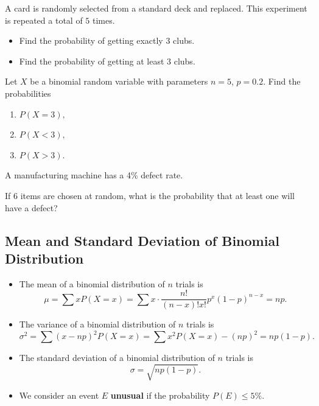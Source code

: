 \begin{example}

A card is randomly selected from a standard deck and replaced. This
experiment is repeated a total of \(5\) times.

\begin{itemize}
\item
  Find the probability of getting exactly \(3\) clubs.
\item
  Find the probability of getting at least \(3\) clubs.
\end{itemize}

\end{example}

\begin{exercise}

Let \(X\) be a binomial random variable with parameters \(n = 5\),
\(p=0.2\). Find the probabilities

\begin{enumerate}
\item
  \(P(X=3),\)
\item
  \(P(X<3),\)
\item
  \(P(X>3).\)
\end{enumerate}

\end{exercise}

\begin{exercise}

A manufacturing machine has a 4\% defect rate.

If 6 items are chosen at random, what is the probability that at least
one will have a defect?

\end{exercise}

\hypertarget{mean-and-standard-deviation-of-binomial-distribution}{%
\subsection{Mean and Standard Deviation of Binomial
Distribution}\label{mean-and-standard-deviation-of-binomial-distribution}}

\begin{itemize}
\item
  The mean of a binomial distribution of \(n\) trials is
  \[\mu =\sum xP(X=x)=\sum x\cdot \dfrac{n!}{(n-x)!x!}p^x(1-p)^{n-x} = np.\]
\item
  The variance of a binomial distribution of \(n\) trials is
  \[\sigma^2 =\sum (x-np)^2P(X=x)=\sum x^2P(X=x)-(np)^2=np(1-p).\]
\item
  The standard deviation of a binomial distribution of \(n\) trials is
  \[\sigma=\sqrt{np(1-p)}.\]
\item
  We consider an event \(E\) \textbf{unusual} if the probability
  \(P(E)\leq 5\%\).
\end{itemize}

